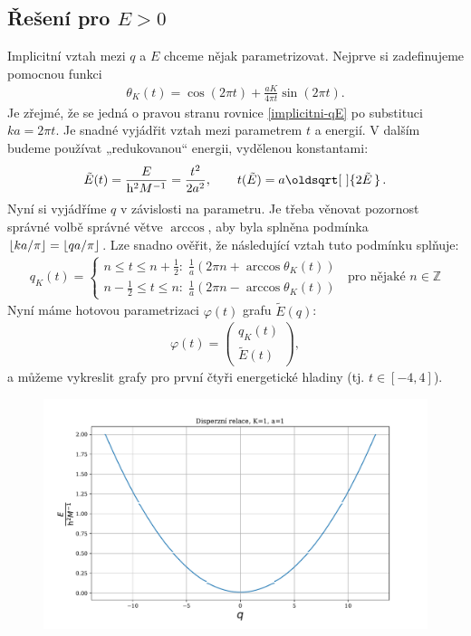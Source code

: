 \documentclass[10pt,a4paper]{article}
\renewcommand*{\sqrt}[2][\ ]{\oldsqrt[#1]{#2\,}\,}
\DeclarePairedDelimiter\floor{\lfloor}{\rfloor}
\newcommand{\mat}[1]{
    \begin{pmatrix}
        #1
    \end{pmatrix}
}
\begin{document}
\subsection{Řešení pro $E>0$}
Implicitní vztah mezi $q$ a $E$ chceme nějak parametrizovat. Nejprve si zadefinujeme pomocnou funkci
\begin{gather*}
    \theta_K(t) = \cos(2\pi t) + \frac{aK}{4\pi t} \sin(2\pi t).
\end{gather*}
Je zřejmé, že se jedná o pravou stranu rovnice \eqref{implicitni-qE} po substituci $ka=2\pi t$. Je snadné vyjádřit vztah mezi parametrem $t$ a energií. V dalším budeme používat „redukovanou“ energii, vydělenou konstantami:
\begin{gather*}
    \tilde{E}(t) = \frac{E}{\mathrm{h}^2 M^{-1}} = \frac{t^2}{2a^2},
    \hspace{2em}
    t(\tilde{E}) = a \sqrt{2\tilde{E}}.
\end{gather*}
Nyní si vyjádříme $q$ v závislosti na parametru. Je třeba věnovat pozornost správné volbě správné větve $\arccos$, aby byla splněna podmínka $\floor{ka/\pi} = \floor{qa/\pi}$. Lze snadno ověřit, že následující vztah tuto podmínku splňuje:
\begin{gather*}
    q_K(t) = \begin{cases}
        n \leq t \leq n + \frac{1}{2}: \;
        \frac{1}{a} \left( 2\pi n + \arccos \theta_K(t) \right)
        \\[5pt]
        n - \frac{1}{2} \leq t \leq n: \;
        \frac{1}{a} \left( 2\pi n - \arccos \theta_K(t) \right)
    \end{cases}
    \;\;
    \text{pro nějaké } n \in \mathbb{Z}
\end{gather*}
Nyní máme hotovou parametrizaci $\varphi(t)$ grafu $\tilde{E}(q)$:
\begin{gather*}
    \varphi(t) = \mat{
        q_K(t) \\[8pt]
        \tilde{E}(t)
    },
\end{gather*}
a můžeme vykreslit grafy pro první čtyři energetické hladiny (tj. $t \in [-4, 4]$).

\begin{figure}[p]
    \centering
    \includegraphics[scale=0.7]{disperzni1.pdf}
    \label{}
\end{figure}
\end{document}
